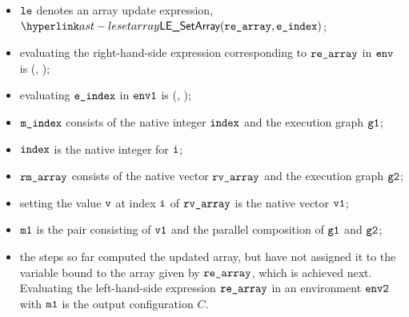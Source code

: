 \ProseParagraph
\AllApply
\begin{itemize}
  \item $\vle$ denotes an array update expression, $\LESetArray(\rearray, \eindex)$;
  \item evaluating the right-hand-side expression corresponding to $\rearray$ in $\env$
  is \Normal(\rmarray, \envone)\ProseOrAbnormal;
  \item evaluating $\eindex$ in $\envone$ is \Normal(\mindex, \envtwo)\ProseOrAbnormal;
  \item $\mindex$ consists of the native integer $\vindex$ and the execution graph $\vgone$;
  \item $\vindex$ is the native integer for $\vi$;
  \item $\rmarray$ consists of the native vector $\rvarray$ and the execution graph $\vgtwo$;
  \item setting the value $\vv$ at index $\vi$ of $\rvarray$ is the native vector $\vvone$;
  \item $\vmone$ is the pair consisting of $\vvone$ and the parallel composition of $\vgone$ and $\vgtwo$;
  \item the steps so far computed the updated array, but have not assigned it to the variable
  bound to the array given by $\rearray$, which is achieved next.
  Evaluating the left-hand-side expression $\rearray$ in an environment $\envtwo$ with $\vmone$
  is the output configuration $C$.
\end{itemize}
\FormallyParagraph
\begin{mathpar}
\end{mathpar}

